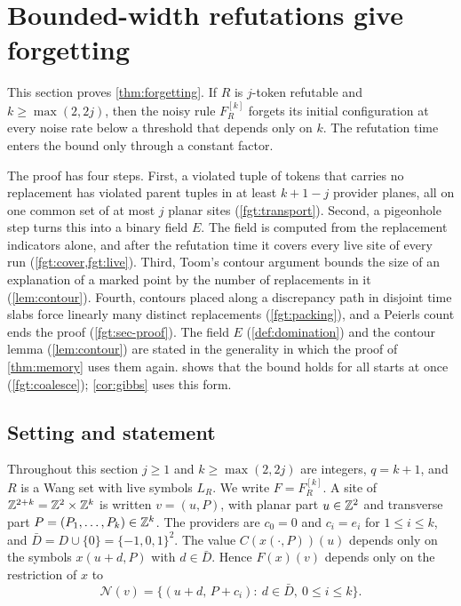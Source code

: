 \section{Bounded-width refutations give forgetting}\label{sec:forgetting}

This section proves \cref{thm:forgetting}. If $R$ is $j$-token refutable and $k\ge\max(2,2j)$, then the noisy rule $F^{[k]}_R$ forgets its initial configuration at every noise rate below a threshold that depends only on $k$. The refutation time enters the bound only through a constant factor.

The proof has four steps. First, a violated tuple of tokens that carries no replacement has violated parent tuples in at least $k+1-j$ provider planes, all on one common set of at most $j$ planar sites (\cref{fgt:transport}). Second, a pigeonhole step turns this into a binary field $E$. The field is computed from the replacement indicators alone, and after the refutation time it covers every live site of every run (\cref{fgt:cover,fgt:live}). Third, Toom's contour argument bounds the size of an explanation of a marked point by the number of replacements in it (\cref{lem:contour}). Fourth, contours placed along a discrepancy path in disjoint time slabs force linearly many distinct replacements (\cref{fgt:packing}), and a Peierls count ends the proof (\cref{fgt:sec-proof}). The field $E$ (\cref{def:domination}) and the contour lemma (\cref{lem:contour}) are stated in the generality in which the proof of \cref{thm:memory} uses them again.  shows that the bound holds for all starts at once (\cref{fgt:coalesce}); \cref{cor:gibbs} uses this form.

\subsection{Setting and statement}\label{fgt:sec-setting}

Throughout this section $j\ge1$ and $k\ge\max(2,2j)$ are integers, $q=k+1$, and $R$ is a Wang set with live symbols $L_R$. We write $F=F^{[k]}_R$. A site of $\mathbb{Z}^{2+k}=\mathbb{Z}^2\times\mathbb{Z}^k$ is written $v=(u,P)$, with planar part $u\in\mathbb{Z}^2$ and transverse part $P=(P_1,\dots,P_k)\in\mathbb{Z}^k$. The providers are $c_0=0$ and $c_i=e_i$ for $1\le i\le k$, and $\bar D=D\cup\{0\}=\{-1,0,1\}^2$. The value $C(x(\cdot,P))(u)$ depends only on the symbols $x(u+d,P)$ with $d\in\bar D$. Hence $F(x)(v)$ depends only on the restriction of $x$ to
\begin{equation}\label{fgt:eq-nbhd}
\mathcal N(v)=\bigl\{(u+d,\,P+c_i):\ d\in\bar D,\ 0\le i\le k\bigr\}.
\end{equation}


